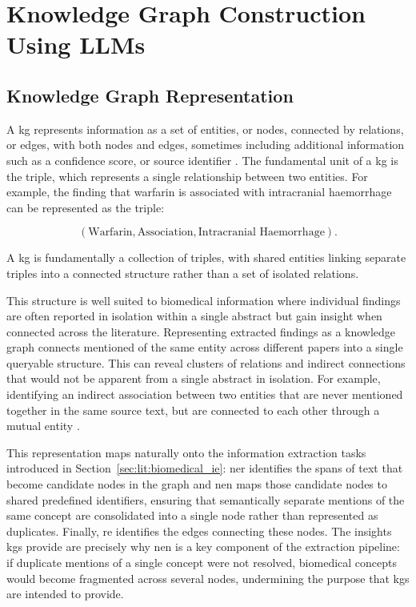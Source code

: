 \section{Knowledge Graph Construction Using LLMs}
\label{sec:lit:kg_construction_using_llms}

\subsection{Knowledge Graph Representation}
\label{subsec:lit:kg_representation}
A \gls{kg} represents information as a set of entities, or nodes, connected by relations, or edges, with both nodes and edges, sometimes including additional information such as a confidence score, or source identifier \pref. The fundamental unit of a \gls{kg} is the triple, which represents a single relationship between two entities. For example, the finding that warfarin is associated with intracranial haemorrhage can be represented as the triple:

\[
(
    \text{Warfarin},
    \text{Association},
    \text{Intracranial Haemorrhage}
).
\]

\vspace{0.5em}

\noindent A \gls{kg} is fundamentally a collection of triples, with shared entities linking separate triples into a connected structure rather than a set of isolated relations.

This structure is well suited to biomedical information where individual findings are often reported in isolation within a single abstract but gain insight when connected across the literature. Representing extracted findings as a knowledge graph connects mentioned of the same entity across different papers into a single queryable structure. This can reveal clusters of relations and indirect connections that would not be apparent from a single abstract in isolation. For example, identifying an indirect association between two entities that are never mentioned together in the same source text, but are connected to each other through a mutual entity \pref.

This representation maps naturally onto the information extraction tasks introduced in Section~\ref{sec:lit:biomedical_ie}: \gls{ner} identifies the spans of text that become candidate nodes in the graph and \gls{nen} maps those candidate nodes to shared predefined identifiers, ensuring that semantically separate mentions of the same concept are consolidated into a single node rather than represented as duplicates. Finally, \gls{re} identifies the edges connecting these nodes. The insights \glspl{kg} provide are precisely why \gls{nen} is a key component of the extraction pipeline: if duplicate mentions of a single concept were not resolved, biomedical concepts would become fragmented across several nodes, undermining the purpose that \glspl{kg} are intended to provide.

